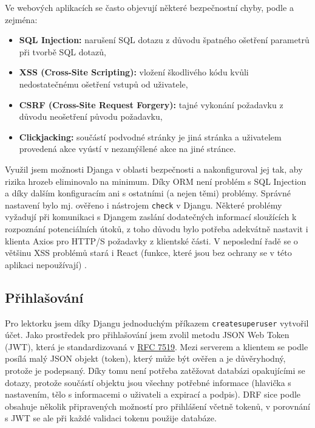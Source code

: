     Ve webových aplikacích se často objevují některé bezpečnostní chyby, podle \cite{bezpecnost1} a \cite{bezpecnost2} zejména:
    \begin{itemize}
        \item \textbf{SQL Injection:} narušení SQL dotazu z důvodu špatného ošetření parametrů při tvorbě SQL dotazů,
        \item \textbf{XSS (Cross-Site Scripting):} vložení škodlivého kódu kvůli nedostatečnému ošetření vstupů od uživatele,
        \item \textbf{CSRF (Cross-Site Request Forgery):} tajné vykonání požadavku z důvodu neošetření původu požadavku,
        \item \textbf{Clickjacking:} součástí podvodné stránky je jiná stránka a uživatelem provedená akce vyústí v nezamýšlené akce na jiné stránce.
    \end{itemize}
    
    Využil jsem možnosti Djanga v oblasti bezpečnosti \cite{bezpecnost1} a nakonfiguroval jej tak, aby rizika hrozeb eliminovalo na minimum. Díky ORM není problém s SQL Injection a díky dalším konfiguracím ani s ostatními (a nejen těmi) problémy. Správné nastavení bylo mj. ověřeno i nástrojem \verb|check| v Djangu. Některé problémy vyžadují při komunikaci s Djangem zaslání dodatečných informací sloužících k rozpoznání potenciálních útoků, z toho důvodu bylo potřeba adekvátně nastavit i klienta Axios pro HTTP/S požadavky z klientské části. V neposlední řadě se o většinu XSS problémů stará i React (funkce, které jsou bez ochrany se v této aplikaci nepoužívají) \cite{bezpecnost3}.
    
    \subsection{Přihlašování}
    Pro lektorku jsem díky Djangu jednoduchým příkazem \verb|createsuperuser| vytvořil účet. Jako prostředek pro přihlašování jsem zvolil metodu JSON Web Token (JWT), která je standardizovaná v \href{https://tools.ietf.org/html/rfc7519}{RFC 7519}. Mezi serverem a klientem se podle \cite{jwt1} posílá malý JSON objekt (token), který může být ověřen a je důvěryhodný, protože je podepsaný. Díky tomu není potřeba zatěžovat databázi opakujícími se dotazy, protože součástí objektu jsou všechny potřebné informace (hlavička s nastavením, tělo s informacemi o uživateli a expirací a podpis). DRF sice podle \cite{drf1} obsahuje několik připravených možností pro přihlášení včetně tokenů, v porovnání s JWT se ale při každé validaci tokenu použije databáze.
    
